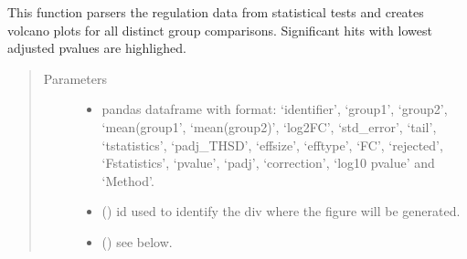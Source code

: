 \documentclass[letterpaper,10pt,english]{sphinxmanual}
\begin{document}

\begin{fulllineitems}
\label{\detokenize{_autosummary/analytics_core.viz:analytics_core.viz.viz.run_volcano}}
This function parsers the regulation data from statistical tests and creates volcano plots for all distinct group comparisons. Significant hits with lowest adjusted p\sphinxhyphen{}values are highlighed.
\begin{quote}\begin{description}
\item[{Parameters}] \leavevmode\begin{itemize}
\item {} 
 \textendash{} pandas dataframe with format: ‘identifier’, ‘group1’, ‘group2’, ‘mean(group1’, ‘mean(group2)’, ‘log2FC’, ‘std\_error’, ‘tail’, ‘t\sphinxhyphen{}statistics’, ‘padj\_THSD’,                                                 ‘effsize’, ‘efftype’, ‘FC’, ‘rejected’, ‘F\sphinxhyphen{}statistics’, ‘pvalue’, ‘padj’, ‘correction’, ‘\sphinxhyphen{}log10 pvalue’ and ‘Method’.

\item {} 
 () \textendash{} id used to identify the div where the figure will be generated.

\item {} 
 () \textendash{} see below.


\end{itemize}
\end{description}
\end{quote}
\end{fulllineitems}
\end{document}
